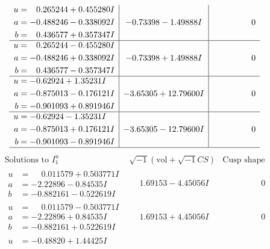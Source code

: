 \documentclass[1p]{elsarticle_modified}
\theoremstyle{definition}
\newcommand{\I}{\sqrt{-1}}
\begin{document}
$$\begin{array}{c|c|c}
\begin{aligned}
u &= \phantom{-}0.265244 + 0.455280 I \\
a &= -0.488246 - 0.338092 I \\
b &= \phantom{-}0.436577 + 0.357347 I\end{aligned}
 & -0.73398 - 1.49888 I & \phantom{-0.000000 } 0 \\ \hline\begin{aligned}
u &= \phantom{-}0.265244 - 0.455280 I \\
a &= -0.488246 + 0.338092 I \\
b &= \phantom{-}0.436577 - 0.357347 I\end{aligned}
 & -0.73398 + 1.49888 I & \phantom{-0.000000 } 0 \\ \hline\begin{aligned}
u &= -0.62924 + 1.35231 I \\
a &= -0.875013 - 0.176121 I \\
b &= -0.901093 + 0.891946 I\end{aligned}
 & -3.65305 + 12.79600 I & \phantom{-0.000000 } 0 \\ \hline\begin{aligned}
u &= -0.62924 - 1.35231 I \\
a &= -0.875013 + 0.176121 I \\
b &= -0.901093 - 0.891946 I\end{aligned}
 & -3.65305 - 12.79600 I & \phantom{-0.000000 } 0\\
 \hline 
 \end{array}$$\newpage$$\begin{array}{c|c|c}  
\text{Solutions to }I^u_{1}& \I (\text{vol} + \sqrt{-1}CS) & \text{Cusp shape}\\
 \hline 
\begin{aligned}
u &= \phantom{-}0.011579 + 0.503771 I \\
a &= -2.22896 - 0.84535 I \\
b &= -0.882161 - 0.522619 I\end{aligned}
 & \phantom{-}1.69153 - 4.45056 I & \phantom{-0.000000 } 0 \\ \hline\begin{aligned}
u &= \phantom{-}0.011579 - 0.503771 I \\
a &= -2.22896 + 0.84535 I \\
b &= -0.882161 + 0.522619 I\end{aligned}
 & \phantom{-}1.69153 + 4.45056 I & \phantom{-0.000000 } 0 \\ \hline\begin{aligned}
u &= -0.48820 + 1.44425 I \\

\end{aligned}
\end{array}$$
\end{document}
